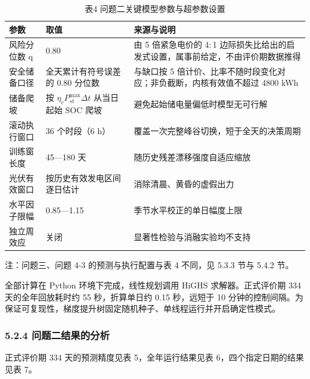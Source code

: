 \documentclass[12pt,a4paper]{ctexart}
\begin{document}
\begin{table}[H]
\centering
\caption*{表4 问题二关键模型参数与超参数设置}
\begin{tabular}{C{0.24\textwidth}C{0.38\textwidth}C{0.38\textwidth}}
\toprule
参数 & 取值 & 来源与说明 \\
\midrule
风险分位数 q & 0.80 & 由 5 倍紧急电价的 4$:$1 边际损失比给出的启发式设置，属事前给定，不由评价期数据推得 \\
安全储备口径 & 全天累计有符号误差的 0.80 分位数 & 与缺口按 5 倍计价、比率不随时段变化对应；非负截断，内核有效值不超过 4800 kWh \\
储备爬坡 & 按 $\eta_c P_{st}^{\max}\Delta t$ 从当日起始 SOC 爬坡 & 避免起始储电量偏低时模型无可行解 \\
滚动执行窗口 & 36 个时段（6 h） & 覆盖一次完整峰谷切换，短于全天的决策周期 \\
训练窗长度 & 45—180 天 & 随历史残差漂移强度自适应缩放 \\
光伏有效窗口 & 按历史有效发电区间逐日估计 & 消除清晨、黄昏的虚假出力 \\
水平因子限幅 & 0.85—1.15 & 季节水平校正的单日幅度上限 \\
独立周效应 & 关闭 & 显著性检验与消融实验均不支持 \\
\bottomrule
\end{tabular}
\par\vspace{2pt}\footnotesize 注：问题三、问题 4-3 的预测与执行配置与表 4 不同，见 5.3.3 节与 5.4.2 节。
\end{table}

全部计算在 Python 环境下完成，线性规划调用 HiGHS 求解器。正式评价期 334 天的全年回放耗时约 55 秒，折算单日约 0.15 秒，远短于 10 分钟的控制间隔。为保证可复现性，梯度提升树固定随机种子、单线程运行并开启确定性模式。

\subsubsection*{5.2.4 问题二结果的分析}

正式评价期 334 天的预测精度见表 5，全年运行结果见表 6，四个指定日期的结果见表 7。
\end{document}
